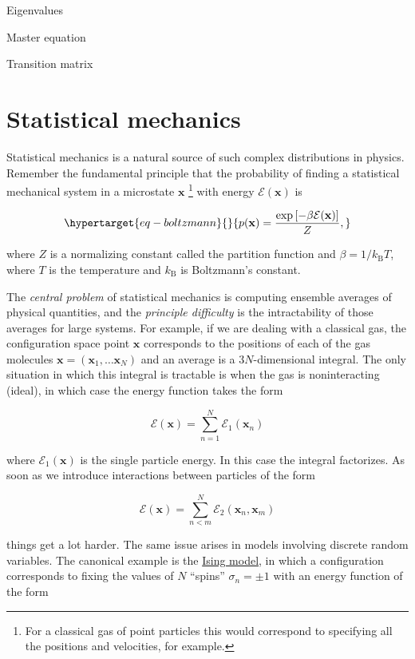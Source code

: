 \documentclass[
  letterpaper,
  DIV=11,
  numbers=noendperiod]{scrreprt}
\theoremstyle{definition}
\theoremstyle{remark}
\begin{document}
Eigenvalues

Master equation

Transition matrix

\hypertarget{sec-statmech}{%
\section{Statistical mechanics}\label{sec-statmech}}

Statistical mechanics is a natural source of such complex distributions
in physics. Remember the fundamental principle that the probability of
finding a statistical mechanical system in a microstate \(\mathbf{x}\)
\footnote{For a classical gas of point particles this would correspond
  to specifying all the positions and velocities, for example.} with
energy \(\mathcal{E}(\mathbf{x})\) is

\begin{equation}\protect\hypertarget{eq-boltzmann}{}{
p(\mathbf{x})=\frac{\exp\left[-\beta \mathcal{E}(\mathbf{x})\right]}{Z},
}\label{eq-boltzmann}\end{equation}

where \(Z\) is a normalizing constant called the partition function and
\(\beta=1/k_\text{B}T\), where \(T\) is the temperature and
\(k_\text{B}\) is Boltzmann's constant.

The \emph{central problem} of statistical mechanics is computing
ensemble averages of physical quantities, and the \emph{principle
difficulty} is the intractability of those averages for large systems.
For example, if we are dealing with a classical gas, the configuration
space point \(\mathbf{x}\) corresponds to the positions of each of the
gas molecules \(\mathbf{x}=(\mathbf{x}_1,\ldots \mathbf{x}_N)\) and an
average is a \(3N\)-dimensional integral. The only situation in which
this integral is tractable is when the gas is noninteracting (ideal), in
which case the energy function takes the form

\[
\mathcal{E}(\mathbf{x}) = \sum_{n=1}^N \mathcal{E}_1(\mathbf{x}_n)
\]

where \(\mathcal{E}_1(\mathbf{x})\) is the single particle energy. In
this case the integral factorizes. As soon as we introduce interactions
between particles of the form

\[
\mathcal{E}(\mathbf{x}) = \sum_{n<m}^N \mathcal{E}_2(\mathbf{x}_n,\mathbf{x}_m)
\]

things get a lot harder. The same issue arises in models involving
discrete random variables. The canonical example is the
\href{https://en.wikipedia.org/wiki/Ising_model}{Ising model}, in which
a configuration corresponds to fixing the values of \(N\) ``spins''
\(\sigma_n=\pm 1\) with an energy function of the form
\end{document}
